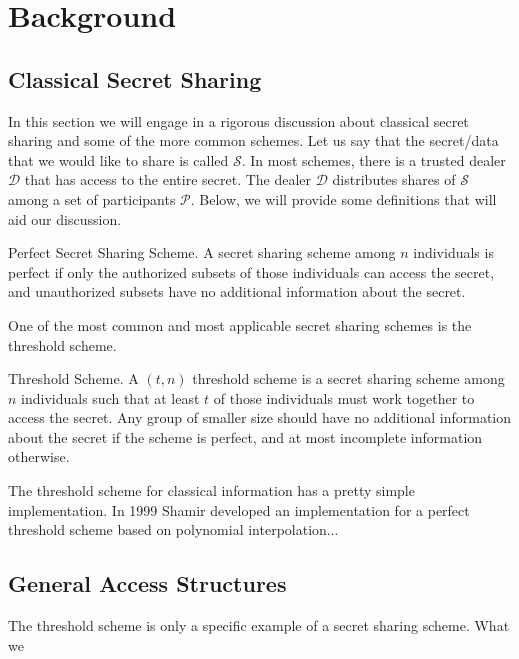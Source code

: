 \chapter{Background}

\section{Classical Secret Sharing}

In this section we will engage in a rigorous discussion about classical secret sharing and some of the more common schemes. Let us say that the secret/data that we would like to share is called $\mathcal{S}$. In most schemes, there is a trusted dealer $\mathcal{D}$ that has access to the entire secret. The dealer $\mathcal{D}$ distributes shares of $\mathcal{S}$ among a set of participants $\mathcal{P}$. Below, we will provide some definitions that will aid our discussion.

\theoremstyle{definition}
\begin{definition}{Perfect Secret Sharing Scheme.}
    A secret sharing scheme among $n$ individuals is perfect if only the authorized subsets of those individuals can access the secret, and unauthorized subsets have no additional information about the secret.
\end{definition}

One of the most common and most applicable secret sharing schemes is the threshold scheme.

\theoremstyle{definition}
\begin{definition}{Threshold Scheme.}
    A $(t,n)$ threshold scheme is a secret sharing scheme among $n$ individuals such that at least $t$ of those individuals must work together to access the secret. Any group of smaller size should have no additional information about the secret if the scheme is perfect, and at most incomplete information otherwise. 
\end{definition}

 The threshold scheme for classical information has a pretty simple implementation. In 1999 Shamir developed an implementation for a perfect threshold scheme based on polynomial interpolation...
 
 \section{General Access Structures}
 
 The threshold scheme is only a specific example of a secret sharing scheme. What we 

